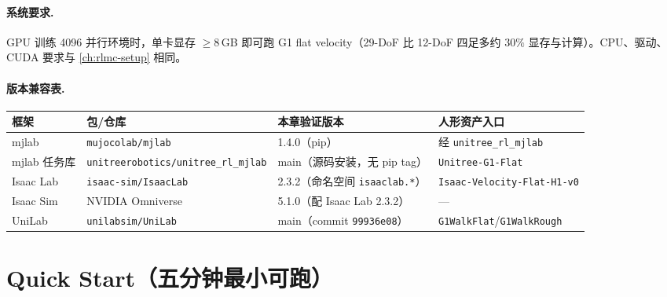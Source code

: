 \paragraph{系统要求.}
GPU 训练 4096 并行环境时，单卡显存 $\geq 8$\,GB 即可跑 G1 flat velocity（29-DoF 比 12-DoF 四足多约 $30\%$ 显存与计算）。CPU、驱动、CUDA 要求与 \cref{ch:rlmc-setup} 相同。

\paragraph{版本兼容表.}

\begin{center}
\small
\begin{tabular}{llll}
\hline
框架 & 包/仓库 & 本章验证版本 & 人形资产入口 \\
\hline
mjlab & \texttt{mujocolab/\allowbreak mjlab} & 1.4.0（pip） & 经 \texttt{unitree\_rl\_mjlab} \\
mjlab 任务库 & \texttt{unitreerobotics/\allowbreak unitree\_rl\_mjlab} & main（源码安装，无 pip tag）& \texttt{Unitree-G1-Flat} \\
Isaac Lab & \texttt{isaac-sim/\allowbreak IsaacLab} & 2.3.2（命名空间 \texttt{isaaclab.*}）& \texttt{Isaac-Velocity-Flat-H1-v0} \\
Isaac Sim & NVIDIA Omniverse & 5.1.0（配 Isaac Lab 2.3.2）& --- \\
UniLab & \texttt{unilabsim/\allowbreak UniLab} & main（commit \texttt{99936e08}）& \texttt{G1WalkFlat}/\allowbreak\texttt{G1WalkRough} \\
\hline
\end{tabular}
\end{center}


\section*{Quick Start（五分钟最小可跑）}

